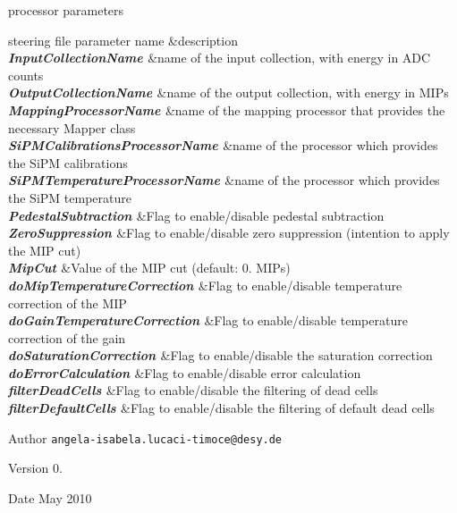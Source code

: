 \begin{DoxyParagraph}{processor parameters}
\begin{TabularC}{2}
\hline
steering file parameter name &description  \\
{\bfseries {\itshape  Input\-Collection\-Name }}&name of the input collection, with energy in A\-D\-C counts \\
{\bfseries {\itshape  Output\-Collection\-Name }}&name of the output collection, with energy in M\-I\-Ps \\
{\bfseries {\itshape  Mapping\-Processor\-Name }}&name of the mapping processor that provides the necessary Mapper class \\
{\bfseries {\itshape  Si\-P\-M\-Calibrations\-Processor\-Name }}&name of the processor which provides the Si\-P\-M calibrations \\
{\bfseries {\itshape  Si\-P\-M\-Temperature\-Processor\-Name }}&name of the processor which provides the Si\-P\-M temperature \\
{\bfseries {\itshape  Pedestal\-Subtraction }}&Flag to enable/disable pedestal subtraction \\
{\bfseries {\itshape  Zero\-Suppression }}&Flag to enable/disable zero suppression (intention to apply the M\-I\-P cut) \\
{\bfseries {\itshape  Mip\-Cut }}&Value of the M\-I\-P cut (default\-: 0. M\-I\-Ps) \\
{\bfseries {\itshape  do\-Mip\-Temperature\-Correction }}&Flag to enable/disable temperature correction of the M\-I\-P \\
{\bfseries {\itshape  do\-Gain\-Temperature\-Correction }}&Flag to enable/disable temperature correction of the gain \\
{\bfseries {\itshape  do\-Saturation\-Correction }}&Flag to enable/disable the saturation correction \\
{\bfseries {\itshape  do\-Error\-Calculation }}&Flag to enable/disable error calculation \\
{\bfseries {\itshape  filter\-Dead\-Cells }}&Flag to enable/disable the filtering of dead cells \\
{\bfseries {\itshape  filter\-Default\-Cells }}&Flag to enable/disable the filtering of default dead cells \\
\end{TabularC}

\end{DoxyParagraph}
\begin{DoxyAuthor}{Author}
{\tt angela-\/isabela.\-lucaci-\/timoce@desy.\-de} 
\end{DoxyAuthor}
\begin{DoxyVersion}{Version}
0. 
\end{DoxyVersion}
\begin{DoxyDate}{Date}
May 2010 
\end{DoxyDate}


